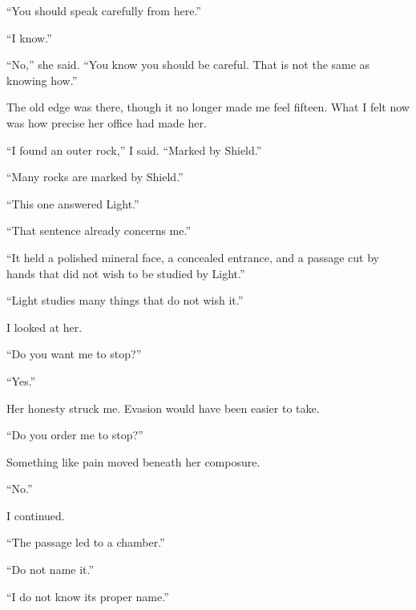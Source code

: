 ``You should speak carefully from here.''\par

``I know.''\par

``No,'' she said. ``You know you should be careful. That is not the same as knowing how.''\par

The old edge was there, though it no longer made me feel fifteen. What I felt now was how precise her office had made her.\par

``I found an outer rock,'' I said. ``Marked by Shield.''\par

``Many rocks are marked by Shield.''\par

``This one answered Light.''\par

``That sentence already concerns me.''\par

``It held a polished mineral face, a concealed entrance, and a passage cut by hands that did not wish to be studied by Light.''\par

``Light studies many things that do not wish it.''\par

I looked at her.\par

``Do you want me to stop?''\par

``Yes.''\par

Her honesty struck me. Evasion would have been easier to take.\par

``Do you order me to stop?''\par

Something like pain moved beneath her composure.\par

``No.''\par

I continued.\par

``The passage led to a chamber.''\par

``Do not name it.''\par

``I do not know its proper name.''\par

